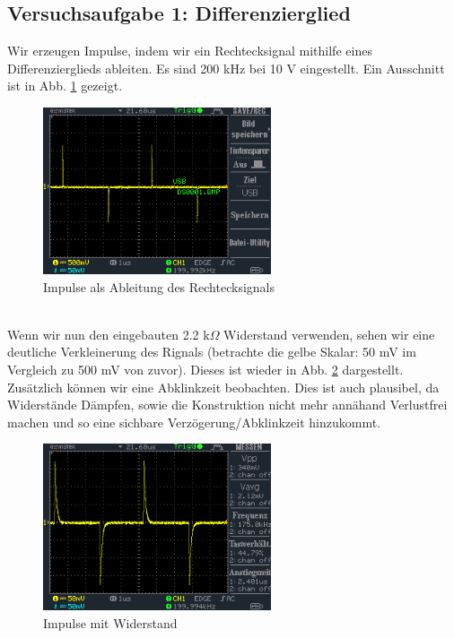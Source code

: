 \documentclass[a4paper,10pt]{article}
\numberwithin{equation}{section}
\begin{document}
\subsection{Versuchsaufgabe 1: Differenzierglied}
Wir erzeugen Impulse, indem wir ein Rechtecksignal mithilfe eines Differenzierglieds ableiten. Es sind 200 kHz bei 10 V eingestellt. Ein Ausschnitt ist in Abb. \ref{fig:1.1} gezeigt.
\begin{figure}[h]
        \centering
        \includegraphics[width=0.6\textwidth]{data/DS0001.BMP.png}
        \caption{Impulse als Ableitung des Rechtecksignals}
		\label{fig:1.1}
\end{figure}\\
Wenn wir nun den eingebauten 2.2 k$\Omega$ Widerstand verwenden, sehen wir eine deutliche Verkleinerung des Rignals (betrachte die gelbe Skalar: 50 mV im Vergleich zu 500 mV von zuvor). Dieses ist wieder in Abb. \ref{fig:1.2} dargestellt. Zusätzlich können wir eine Abklinkzeit beobachten. Dies ist auch plausibel, da Widerstände Dämpfen, sowie die Konstruktion nicht mehr annähand Verlustfrei machen und so eine sichbare Verzögerung/Abklinkzeit hinzukommt.
\begin{figure}[h]
        \centering
        \includegraphics[width=0.6\textwidth]{data/DS0003.BMP.png}
        \caption{Impulse mit Widerstand}
		\label{fig:1.2}
\end{figure}
\end{document}
